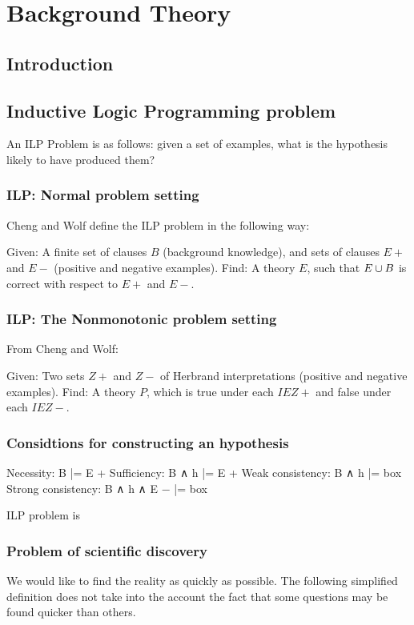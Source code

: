 
\chapter{Background Theory}

\label{ch:background}

\section{Introduction}

\section{Inductive Logic Programming problem}

An ILP Problem is as follows: given a set of examples, what is the hypothesis likely to have produced them?

\subsection{ILP: Normal problem setting}
Cheng and Wolf define the ILP problem in the following way:

Given: A finite set of clauses $B$ (background knowledge), and sets of clauses $E+$ and $E-$ (positive and negative examples).
Find: A theory $E$, such that $E \cup B$ is correct with respect to $E+$ and $E-$.

\subsection{ILP: The Nonmonotonic problem setting}
From Cheng and Wolf:

Given: Two sets $Z+$ and $Z-$ of Herbrand interpretations (positive and negative examples).
Find: A theory $P$, which is true under each $I E Z+$ and false
under each $I E Z-$.

\subsection{Considtions for constructing an hypothesis}
Necessity: B |= E +
Sufficiency: B ∧ h |= E +
Weak consistency: B ∧ h |= box
Strong consistency: B ∧ h ∧ E − |= box

ILP problem is 

\subsection{Problem of scientific discovery}
We would like to find the reality as quickly as possible. The following simplified definition does not take into the account the fact that some questions may be found quicker than others.

